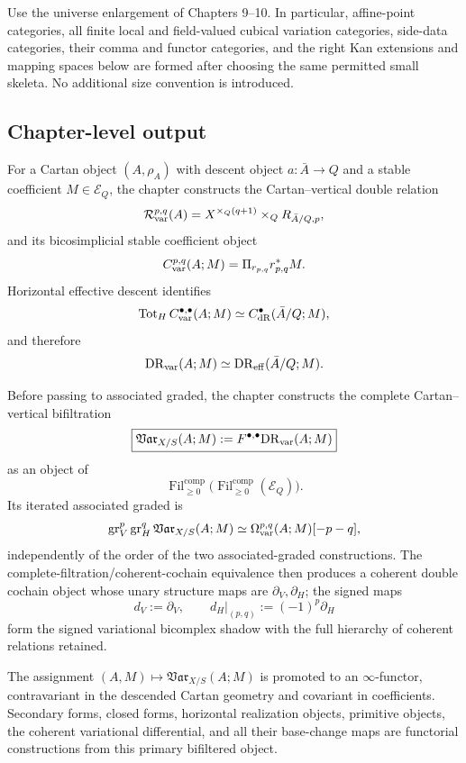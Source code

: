 \begin{convention}[Universes]
\label{conv:var-universes}
Use the universe enlargement of Chapters 9--10. In particular, affine-point categories, all finite local and field-valued cubical variation categories, side-data categories, their comma and functor categories, and the right Kan extensions and mapping spaces below are formed after choosing the same permitted small skeleta. No additional size convention is introduced.
\end{convention}

\subsection{Chapter-level output}
\label{subsec:var-output-preview}

For a Cartan object \((A,\rho_A)\) with descent object \(a:\bar A\to Q\) and a stable coefficient \(M\in\mathcal E_Q\), the chapter constructs the Cartan--vertical double relation
\[
    \mathcal R_{\mathrm{var}}^{p,q}(A)
    =
    X^{\times_Q(q+1)}\times_QR_{\bar A/Q,p},
\]
and its bicosimplicial stable coefficient object
\[
    C_{\mathrm{var}}^{p,q}(A;M)
    =
    \Pi_{r_{p,q}}r_{p,q}^*M.
\]
Horizontal effective descent identifies
\[
    \operatorname{Tot}_HC_{\mathrm{var}}^{\bullet,\bullet}(A;M)
    \simeq
    C_{\mathrm{dR}}^{\bullet}(\bar A/Q;M),
\]
and therefore
\[
    \mathrm{DR}_{\mathrm{var}}(A;M)
    \simeq
    \mathrm{DR}_{\mathrm{eff}}(\bar A/Q;M).
\]

Before passing to associated graded, the chapter constructs the complete Cartan--vertical bifiltration
\[
    \boxed{
    \mathfrak{Var}_{X/S}(A;M)
    :=
    F^{\bullet,\bullet}\mathrm{DR}_{\mathrm{var}}(A;M)
    }
\]
as an object of
\[
    \operatorname{Fil}^{\mathrm{comp}}_{\ge0}
    \bigl(
      \operatorname{Fil}^{\mathrm{comp}}_{\ge0}(\mathcal E_Q)
    \bigr).
\]
Its iterated associated graded is
\[
    \operatorname{gr}_V^p\operatorname{gr}_H^q\mathfrak{Var}_{X/S}(A;M)
    \simeq
    \Omega_{\mathrm{var}}^{p,q}(A;M)[-p-q],
\]
independently of the order of the two associated-graded constructions. The complete-filtration/coherent-cochain equivalence then produces a coherent double cochain object whose unary structure maps are \(\partial_V,\partial_H\); the signed maps
\[
    d_V:=\partial_V,
    \qquad
    d_H|_{(p,q)}:=(-1)^p\partial_H
\]
form the signed variational bicomplex shadow with the full hierarchy of coherent relations retained.

The assignment \((A,M)\mapsto\mathfrak{Var}_{X/S}(A;M)\) is promoted to an \(\infty\)-functor, contravariant in the descended Cartan geometry and covariant in coefficients. Secondary forms, closed forms, horizontal realization objects, primitive objects, the coherent variational differential, and all their base-change maps are functorial constructions from this primary bifiltered object.

